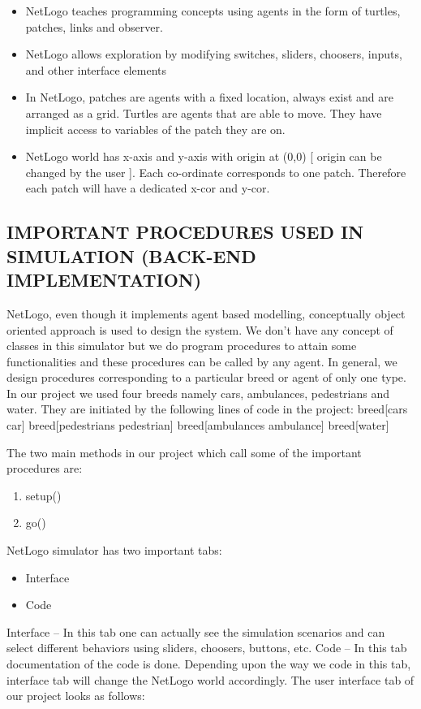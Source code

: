 \documentclass[11pt,a4paper]{article}
\begin{document}
\begin{itemize}
\item NetLogo teaches programming concepts using agents in the form of turtles, patches, links and observer.  
\item NetLogo allows exploration by modifying switches, sliders, choosers, inputs, and other interface elements
\item In NetLogo, patches are agents with a fixed location, always exist and are arranged as a grid. Turtles are agents that are able to move. They have implicit access to variables of the patch they are on.
\item NetLogo world has x-axis and y-axis with origin at (0,0) [ origin can be changed by the user ]. Each co-ordinate corresponds to one patch. Therefore each patch will have a dedicated x-cor and y-cor.
\end{itemize}


\subsection{IMPORTANT PROCEDURES USED IN SIMULATION (BACK-END IMPLEMENTATION)}

NetLogo, even though it implements agent based modelling, conceptually object oriented approach is used to design the system. We don’t have any concept of classes in this simulator but we do program procedures to attain some functionalities and these procedures can be called by any agent.\newline
In general, we design procedures corresponding to a particular breed or agent of only one type. In our project we used four breeds namely cars, ambulances, pedestrians and water. They are initiated by the following lines of code in the project: 
                breed[cars car]
                breed[pedestrians pedestrian]
                breed[ambulances ambulance]
                breed[water]

The two main methods in our project which call some of the important procedures are: 
\begin{enumerate}
\item setup()
\item go()
\end{enumerate}
NetLogo simulator has two important tabs: 
\begin{itemize}
\item Interface
\item Code
\end{itemize}
Interface – In this tab one can actually see the simulation scenarios and can select different behaviors using sliders, choosers, buttons, etc.\newline
Code – In this tab documentation of the code is done. Depending upon the way we code in this tab, interface tab will change the NetLogo world accordingly.
The user interface tab of our project looks as follows: 
\end{document}

